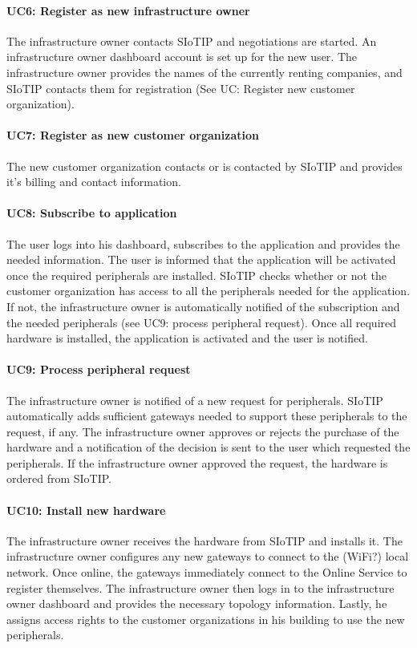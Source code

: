 \documentclass[english]{sareport}
\begin{document}
\paragraph{UC6: Register as new infrastructure owner}
The infrastructure owner contacts SIoTIP and negotiations are started. An infrastructure owner dashboard account is set up for the new user. The infrastructure owner provides the names of the currently renting companies, and SIoTIP contacts them for registration (See UC: Register new customer organization).

\paragraph{UC7: Register as new customer organization}
The new customer organization contacts or is contacted by SIoTIP and provides it's billing and contact information.

\paragraph{UC8: Subscribe to application}
The user logs into his dashboard, subscribes to the application and provides the needed information. The user is informed that the application will be activated once the required peripherals are installed. SIoTIP checks whether or not the customer organization has access to all the peripherals needed for the application. If not, the infrastructure owner is automatically notified of the subscription and the needed peripherals (see UC9: process peripheral request). Once all required hardware is installed, the application is activated and the user is notified.

\paragraph{UC9: Process peripheral request}
The infrastructure owner is notified of a new request for peripherals. SIoTIP automatically adds sufficient gateways needed to support these peripherals to the request, if any. The infrastructure owner approves or rejects the purchase of the hardware and a notification of the decision is sent to the user which requested the peripherals. If the infrastructure owner approved the request, the hardware is ordered from SIoTIP.

\paragraph{UC10: Install new hardware}
The infrastructure owner receives the hardware from SIoTIP and installs it. The infrastructure owner configures any new gateways to connect to the (WiFi?) local network. Once online, the gateways immediately connect to the Online Service to register themselves. The infrastructure owner then logs in to the infrastructure owner dashboard and provides the necessary topology information. Lastly, he assigns access rights to the customer organizations in his building to use the new peripherals.
\end{document}
